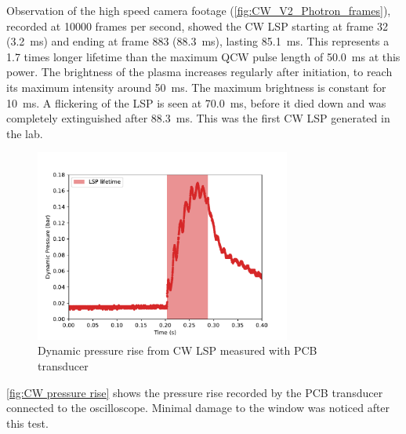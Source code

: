             

            Observation of the high speed camera footage (\autoref{fig:CW_V2_Photron_frames}), recorded at 10000 frames per second, showed the CW LSP starting at frame 32 (\qty{3.2}{ms}) and ending at frame 883 (\qty{88.3}{ms}), lasting \qty{85.1}{ms}. This represents a 1.7 times longer lifetime than the maximum QCW pulse length of \qty{50.0}{ms} at this power. The brightness of the plasma increases regularly after initiation, to reach its maximum intensity around \qty{50}{ms}. The maximum brightness is constant for \qty{10}{ms}. A flickering of the LSP is seen at \qty{70.0}{ms}, before it died down and was completely extinguished after \qty{88.3}{ms}. This was the first CW LSP generated in the lab.

            \begin{figure}[!ht]
                \centering
                \includegraphics[width=0.75\textwidth]{assets/4 experiments/CW pressure rise.pdf}
                \caption{Dynamic pressure rise from CW LSP measured with PCB transducer}
                \label{fig:CW pressure rise}
            \end{figure}

            \autoref{fig:CW pressure rise} shows the pressure rise recorded by the PCB transducer connected to the oscilloscope. Minimal damage to the window was noticed after this test.


    
